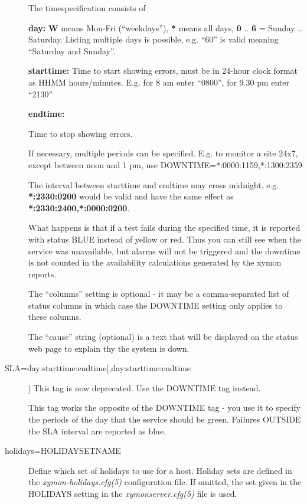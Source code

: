 \begin{description}
  The timespecification consists of 


 \textbf{day:}
 \textbf{W}
 means Mon-Fri (``weekdays''), \textbf{*}
 means all days, \textbf{0}
 .. \textbf{6}
 = Sunday .. Saturday. Listing multiple days is possible, e.g. ``60'' is valid meaning ``Saturday and Sunday''. 


 \textbf{starttime:}
 Time to start showing errors, must be in 24-hour clock format as HHMM
 hours/minutes. E.g. for 8 am enter ``0800'', for 9.30 pm enter
 ``2130'' 



 \textbf{endtime:}

 Time to stop showing errors. 


 If necessary, multiple periods can be specified. E.g. to monitor a
 site 24x7, except between noon and 1 pm, use
 DOWNTIME=*:0000:1159,*:1300:2359 



 The interval between starttime and endtime may cross midnight, e.g. \textbf{*:2330:0200}
 would be valid and have the same effect as \textbf{*:2330:2400,*:0000:0200}. 


  What happens is that if a test fails during the specified time, it
  is reported with status BLUE instead of yellow or red. Thus you can
  still see when the service was unavailable, but alarms will not be
  triggered and the downtime is not counted in the availability
  calculations generated by the xymon reports. 



  The ``columns'' setting is optional - it may be a comma-separated
  list of status columns in which case the DOWNTIME setting only
  applies to these columns. 



  The ``cause'' string (optional) is a text that will be displayed on
  the status web page to explain thy the system is down. 



 

\item[SLA=day:starttime:endtime[,day:starttime:endtime]] This tag is now deprecated. Use the DOWNTIME tag instead. 

  This tag works the opposite of the DOWNTIME tag - you use it to
  specify the periods of the day that the service should be
  green. Failures OUTSIDE the SLA interval are reported as blue. 


\item[holidays=HOLIDAYSETNAME] Define which set of holidays to use for
  a host. Holiday sets are defined in the
  \emph{xymon-holidays.cfg(5)} configuration file. If omitted, the
  set given in the HOLIDAYS setting in the \emph{xymonserver.cfg(5)}
  file is used. 

\end{description}

